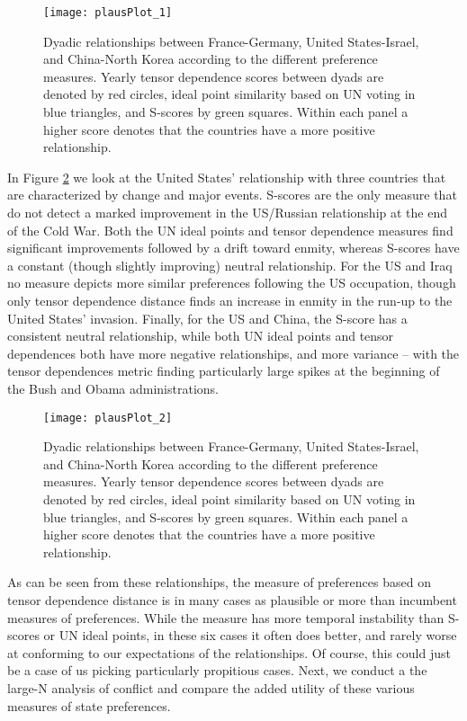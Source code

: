 \begin{figure}
	\centering
	\texttt{[image: plausPlot\_1]}
	\caption{Dyadic relationships between France-Germany, United States-Israel, and China-North Korea according to the different preference measures. Yearly tensor dependence scores between dyads are denoted by red circles, ideal point similarity based on UN voting in blue triangles, and S-scores by green squares. Within each panel a higher score denotes that the countries have a more positive relationship.}
	\label{friendly:dyads}
\end{figure}

In Figure \ref{unfriendly:dyads} we look at the United States' relationship with three countries that are characterized by change and major events. S-scores are the only measure that do not detect a marked improvement in the US/Russian relationship at the end of the Cold War. Both the UN ideal points and tensor dependence measures find significant improvements followed by a drift toward enmity, whereas S-scores have a constant (though slightly improving) neutral relationship. For the US and Iraq no measure depicts more similar preferences following the US occupation, though only tensor dependence distance finds an increase in enmity in the run-up to the United States' invasion. Finally, for the US and China, the S-score has a consistent neutral relationship, while both UN ideal points and tensor dependences both have more negative relationships, and more variance -- with the tensor dependences metric finding particularly large spikes at the beginning of the Bush and Obama administrations.

\begin{figure}
	\centering
	\texttt{[image: plausPlot\_2]}
	\caption{Dyadic relationships between France-Germany, United States-Israel, and China-North Korea according to the different preference measures. Yearly tensor dependence scores between dyads are denoted by red circles, ideal point similarity based on UN voting in blue triangles, and S-scores by green squares. Within each panel a higher score denotes that the countries have a more positive relationship.}
	\label{unfriendly:dyads}
\end{figure}

As can be seen from these relationships, the measure of preferences based on tensor dependence distance is in many cases as plausible or more than incumbent measures of preferences. While the measure has more temporal instability than S-scores or UN ideal points, in these six cases it often does better, and rarely worse at conforming to our expectations of the relationships. Of course, this could just be a case of us picking particularly propitious cases. Next, we conduct a the large-N analysis of conflict and compare the added utility of these various measures of state preferences.

